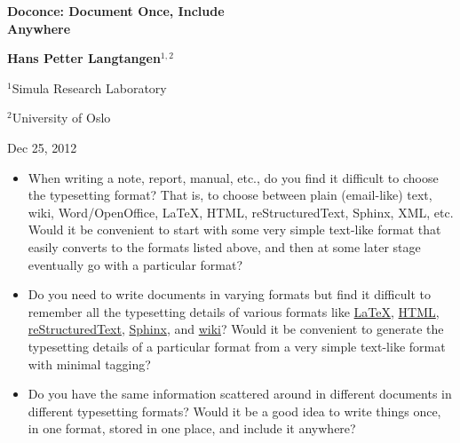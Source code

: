\documentclass[%
oneside,                 %
final,                   %
10pt]{article}
\begin{document}





\begin{center}
{\LARGE\bf Doconce: Document Once, Include \\ [1.5mm] Anywhere}
\end{center}





\begin{center}
{\bf Hans Petter Langtangen${}^{1, 2}$} \\ [0mm]
\end{center}

\begin{center}
\centerline{{\small ${}^1$Simula Research Laboratory}}
\centerline{{\small ${}^2$University of Oslo}}
\end{center}





\begin{center}
Dec 25, 2012
\end{center}

\vspace{1cm}



\begin{itemize}
 \item When writing a note, report, manual, etc., do you find it difficult
   to choose the typesetting format? That is, to choose between plain
   (email-like) text, wiki, Word/OpenOffice, {\LaTeX}, HTML,
   reStructuredText, Sphinx, XML, etc.  Would it be convenient to
   start with some very simple text-like format that easily converts
   to the formats listed above, and then at some later stage
   eventually go with a particular format?

 \item Do you need to write documents in varying formats but find it
   difficult to remember all the typesetting details of various
   formats like \href{{http://refcards.com/docs/silvermanj/amslatex/LaTeXRefCard.v2.0.pdf}}{LaTeX}, \href{{http://www.htmlcodetutorial.com/}}{HTML}, \href{{http://docutils.sourceforge.net/docs/ref/rst/restructuredtext.html}}{reStructuredText}, \href{{http://sphinx.pocoo.org/contents.html}}{Sphinx}, and \href{{http://code.google.com/p/support/wiki/WikiSyntax}}{wiki}? Would it be convenient
   to generate the typesetting details of a particular format from a
   very simple text-like format with minimal tagging?

 \item Do you have the same information scattered around in different
   documents in different typesetting formats? Would it be a good idea
   to write things once, in one format, stored in one place, and
   include it anywhere?
\end{itemize}
\end{document}
